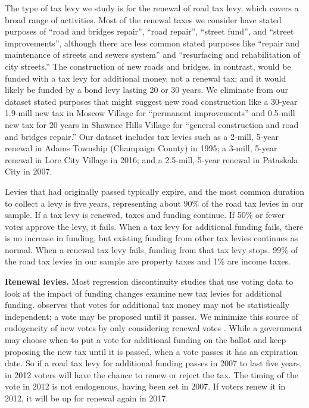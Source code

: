 The type of tax levy we study is for the renewal of road tax levy, which covers a broad range of activities. Most of the renewal taxes we consider have stated purposes of “road and bridges repair”, “road repair”, “street fund”, and “street improvements”, although there are less common stated purposes like “repair and maintenance of streets and sewers system” and “resurfacing and rehabilitation of city streets.”  The construction of new roads and bridges, in contrast, would be funded with a tax levy for additional money, not a renewal tax; and it would likely be funded by a bond levy lasting 20 or 30 years.  We eliminate from our dataset stated purposes that might suggest new road construction like a 30-year 1.9-mill new tax in Moscow Village for “permanent improvements” and 0.5-mill new tax for 20 years in Shawnee Hills Village for “general construction and road and bridges repair.” Our dataset includes tax levies such as a 2-mill, 5-year renewal in Adams Township (Champaign County) in 1995; a 3-mill, 5-year renewal in Lore City Village in 2016; and a 2.5-mill, 5-year renewal in Pataskala City in 2007.

 Levies that had originally passed typically expire, and the most common duration to collect a levy is five years, representing about 90\% of the road tax levies in our sample.  If a tax levy is renewed, taxes and funding continue.  If 50\% or fewer votes approve the levy, it fails.  When a tax levy for additional funding fails, there is no increase in funding, but existing funding from other tax levies continues as normal.  When a renewal tax levy fails, funding from that tax levy stops.  99\% of the road tax levies in our sample are property taxes and 1\% are income taxes.

{\bf Renewal levies.} Most regression discontinuity studies that use voting data to look at the impact of funding changes examine new tax levies for additional funding.  \cite{cellini2010value} observes that votes for additional tax money may not be statistically independent; a vote may be proposed until it passes.  We minimize this source of endogeneity of new votes by only considering renewal votes \citep{brasington2017school}.  While a government may choose when to put a vote for additional funding on the ballot and keep proposing the new tax until it is passed, when a vote passes it has an expiration date.  So if a road tax levy for additional funding passes in 2007 to last five years, in 2012 voters will have the chance to renew or reject the tax.  The timing of the vote in 2012 is not endogenous, having been set in 2007.  If voters renew it in 2012, it will be up for renewal again in 2017. 

